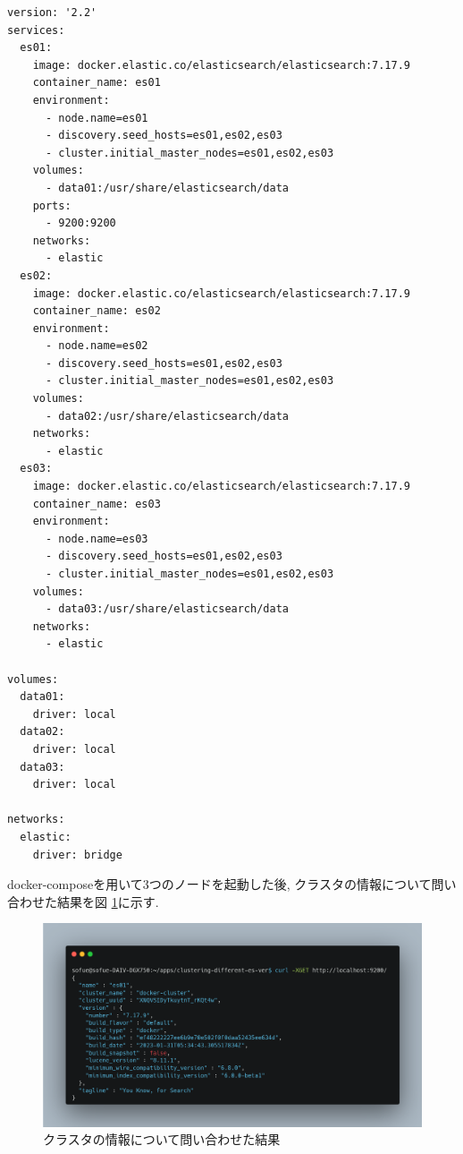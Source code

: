 \documentclass[a4j,12pt,]{jarticle}
\begin{document}
\begin{lstlisting}[caption=クラスタBの構築の際に使用したdocker-compose.yml, label=sc2]
version: '2.2'
services:
  es01:
    image: docker.elastic.co/elasticsearch/elasticsearch:7.17.9
    container_name: es01
    environment:
      - node.name=es01
      - discovery.seed_hosts=es01,es02,es03
      - cluster.initial_master_nodes=es01,es02,es03
    volumes:
      - data01:/usr/share/elasticsearch/data
    ports:
      - 9200:9200
    networks:
      - elastic
  es02:
    image: docker.elastic.co/elasticsearch/elasticsearch:7.17.9
    container_name: es02
    environment:
      - node.name=es02
      - discovery.seed_hosts=es01,es02,es03
      - cluster.initial_master_nodes=es01,es02,es03
    volumes:
      - data02:/usr/share/elasticsearch/data
    networks:
      - elastic
  es03:
    image: docker.elastic.co/elasticsearch/elasticsearch:7.17.9
    container_name: es03
    environment:
      - node.name=es03
      - discovery.seed_hosts=es01,es02,es03
      - cluster.initial_master_nodes=es01,es02,es03
    volumes:
      - data03:/usr/share/elasticsearch/data
    networks:
      - elastic

volumes:
  data01:
    driver: local
  data02:
    driver: local
  data03:
    driver: local

networks:
  elastic:
    driver: bridge
\end{lstlisting}

docker-composeを用いて3つのノードを起動した後, クラスタの情報について問い合わせた結果を図 \ref{p2-1}に示す.

\begin{figure}[H]
  \begin{center}
    \includegraphics[width=160mm]{3nodes-cluster.png}
    \caption{クラスタの情報について問い合わせた結果}
    \label{p2-1}
  \end{center}
\end{figure}
\end{document}
